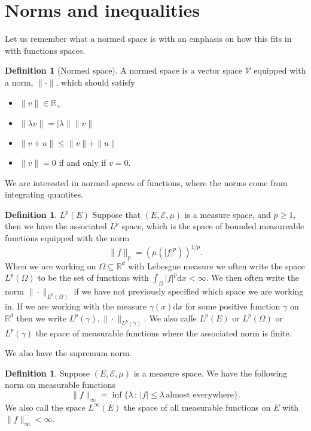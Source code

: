 \documentclass[11pt]{article}
\theoremstyle{definition}
\newtheorem{dfn}[thm]{Definition}
\theoremstyle{remark}
\begin{document}
\section{Norms and inequalities}
Let us remember what a normed space is with an emphasis on how this fits in with functions spaces.
\begin{dfn}[Normed space]
A normed space is a vector space $\mathcal{V}$ equipped with a norm, $\|\cdot\|$, which should satisfy
\begin{itemize}
\item $\| v\| \in \mathbb{R}_+$
\item $\| \lambda v\| = |\lambda\| \|v\|$
\item $\|v+u\| \leq \|v\| + \|u\|$
\item $\|v\|=0$ if and only if $v=0$.
\end{itemize}
\end{dfn}
We are interested in normed spaces of functions, where the norms come from integrating quantites. 

\begin{dfn}{$L^p(E)$}
Suppose that $(E, \mathcal{E}, \mu)$ is a measure space, and $p \geq 1$, then we have the associated $L^p$ space, which is the space of bounded measureable functions equipped with the norm
\[ \| f\|_p = \left( \mu(|f|^p)\right)^{1/p}. \] When we are working on $\Omega \subseteq \mathbb{R}^d$ with Lebesgue measure we often write the space $L^p(\Omega)$ to be the set of functions with $ \int_\Omega |f|^p \mathrm{d}x < \infty$. We then often write the norm $\| \cdot\|_{L^p(\Omega)}$ if we have not previously specified which space we are working in. If we are working with the measure $\gamma(x) \mathrm{d}x$ for some positive function $\gamma$ on $\mathbb{R}^d$ then we write $L^p(\gamma), \| \cdot\|_{L^p(\gamma)}$.  We also calle $L^p(E)$ or $L^p(\Omega)$ or $L^p(\gamma)$ the space of measurable functions where the associated norm is finite.
\end{dfn}

We also have the supremum norm.

\begin{dfn}
Suppose $(E, \mathcal{E}, \mu)$ is a measure space. We have the following norm on measurable functions
\[ \|f\|_\infty = \inf \{ \lambda \,:\, |f| \leq \lambda \, \mbox{almost everywhere}\}. \] We also call the space $L^\infty(E)$ the space of all measurable functions on $E$ with $\|f\|_\infty < \infty$.
\end{dfn}
\end{document}
